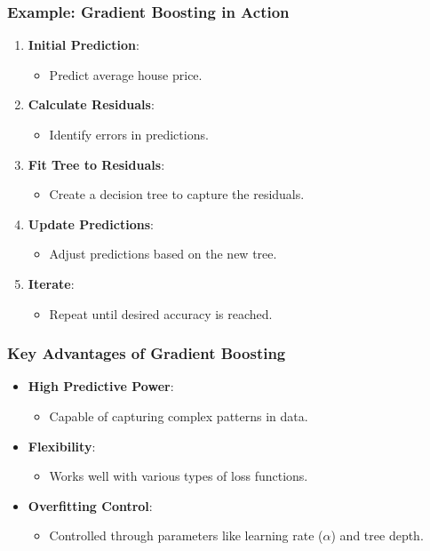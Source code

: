 \documentclass[aspectratio=169]{beamer}
\begin{document}
\begin{frame}[fragile]
    \frametitle{Example: Gradient Boosting in Action}
    \begin{enumerate}
        \item \textbf{Initial Prediction}:
            \begin{itemize}
                \item Predict average house price.
            \end{itemize}
        \item \textbf{Calculate Residuals}:
            \begin{itemize}
                \item Identify errors in predictions.
            \end{itemize}
        \item \textbf{Fit Tree to Residuals}:
            \begin{itemize}
                \item Create a decision tree to capture the residuals.
            \end{itemize}
        \item \textbf{Update Predictions}:
            \begin{itemize}
                \item Adjust predictions based on the new tree.
            \end{itemize}
        \item \textbf{Iterate}: 
            \begin{itemize}
                \item Repeat until desired accuracy is reached.
            \end{itemize}
    \end{enumerate}
\end{frame}

\begin{frame}[fragile]
    \frametitle{Key Advantages of Gradient Boosting}
    \begin{itemize}
        \item \textbf{High Predictive Power}:
            \begin{itemize}
                \item Capable of capturing complex patterns in data.
            \end{itemize}
        \item \textbf{Flexibility}:
            \begin{itemize}
                \item Works well with various types of loss functions.
            \end{itemize}
        \item \textbf{Overfitting Control}:
            \begin{itemize}
                \item Controlled through parameters like learning rate ($\alpha$) and tree depth.
            \end{itemize}
    \end{itemize}
\end{frame}
\end{document}
